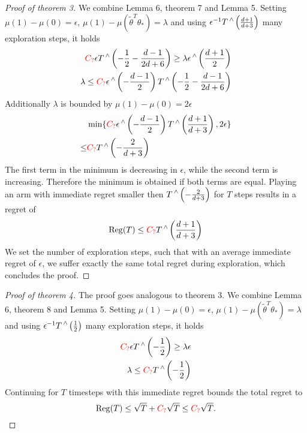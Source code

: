 \documentclass[twoside]{article} \usepackage{aistats2017}
\DeclareMathOperator\caret{\raisebox{1ex}{$\scriptstyle\wedge$}}
\newcommand{\Reg} {
  \operatorname{Reg}}
\newcommand{\uc}{
\color{red}C_?\color{black}
}
\begin{document}
\begin{proof}[Proof of theorem 3]
 We combine Lemma 6, theorem 7 and Lemma 5. Setting $\mu(1)-\mu(0)=\epsilon$, $\mu(1)-\mu(\tilde{\theta}^T\theta_*)=\lambda$ and using $\epsilon^{-1}T\caret\left(\frac{d+1}{d+3}\right)$ many exploration steps, it holds
 \begin{align*}
     \uc\epsilon T\caret\left(-\frac{1}{2}-\frac{d-1}{2d+6}\right)  \geq \lambda \epsilon\caret\left(\frac{d+1}{2}\right)\\
     \lambda \leq \uc \epsilon\caret\left(-\frac{d-1}{2}\right)T\caret\left(-\frac{1}{2}-\frac{d-1}{2d+6}\right)\\
 \end{align*}
 Additionally $\lambda$ is bounded by $\mu(1)-\mu(0)=2\epsilon$
 \begin{align*}
 &\min\{\uc \epsilon\caret\left(-\frac{d-1}{2}\right)T\caret\left(\frac{d+1}{d+3}\right),2\epsilon\}\\
 \leq&\uc T\caret\left(-\frac{2}{d+3}\right) 
 \end{align*}
 The first term in the minimum is decreasing in $\epsilon$, while the second term is increasing. Therefore the minimum is obtained if both terms are equal. Playing an arm with immediate regret smaller then $T\caret\left(-\frac{2}{d+3}\right) $ for $T$ steps results in a regret of
 $$\Reg(T) \leq \uc T\caret\left(\frac{d+1}{d+3}\right)$$
We set the number of exploration steps, such that with an average immediate regret of $\epsilon$, we suffer exactly the same total regret during exploration, which concludes the proof.
\end{proof}

\begin{proof}[Proof of theorem 4]
  The proof goes analogous to theorem 3. We combine Lemma 6, theorem 8 and Lemma 5. Setting $\mu(1)-\mu(0)=\epsilon$, $\mu(1)-\mu(\tilde{\theta}^T\theta_*)=\lambda$ and using $\epsilon^{-1}T\caret\left(\frac{1}{2}\right)$ many exploration steps, it holds
 \begin{align*}
     \uc\epsilon T\caret\left(-\frac{1}{2}\right)  \geq \lambda \epsilon\\
     \lambda \leq \uc T\caret\left(-\frac{1}{2}\right)\\
 \end{align*}
 Continuing for $T$ timesteps with this immediate regret bounds the total regret to
 $$\Reg(T) \leq \sqrt{T}+\uc \sqrt{T} \leq \uc\sqrt{T}.$$
\end{proof}
\end{document}
